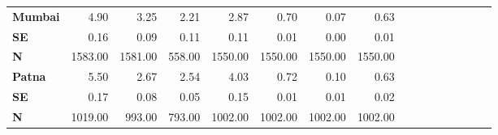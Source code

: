 \begin{tabular}{@{\extracolsep{5pt}}lrrrrrrrrrrrrrrr}
{\bf Mumbai} & 4.90\phantom{***} & 3.25\phantom{***} & 2.21\phantom{***} & 2.87\phantom{***} & 0.70\phantom{***} & 0.07\phantom{***} & 0.63\phantom{***} \\
{\bf SE} & 0.16\phantom{***} & 0.09\phantom{***} & 0.11\phantom{***} & 0.11\phantom{***} & 0.01\phantom{***} & 0.00\phantom{***} & 0.01\phantom{***} \\
{\bf N} & 1583.00\phantom{***} & 1581.00\phantom{***} & 558.00\phantom{***} & 1550.00\phantom{***} & 1550.00\phantom{***} & 1550.00\phantom{***} & 1550.00\phantom{***} \\
{\bf Patna} & 5.50\phantom{***} & 2.67\phantom{***} & 2.54\phantom{***} & 4.03\phantom{***} & 0.72\phantom{***} & 0.10\phantom{***} & 0.63\phantom{***} \\
{\bf SE} & 0.17\phantom{***} & 0.08\phantom{***} & 0.05\phantom{***} & 0.15\phantom{***} & 0.01\phantom{***} & 0.01\phantom{***} & 0.02\phantom{***} \\
{\bf N} & 1019.00\phantom{***} & 993.00\phantom{***} & 793.00\phantom{***} & 1002.00\phantom{***} & 1002.00\phantom{***} & 1002.00\phantom{***} & 1002.00\phantom{***} \\
\hline
\end{tabular}
